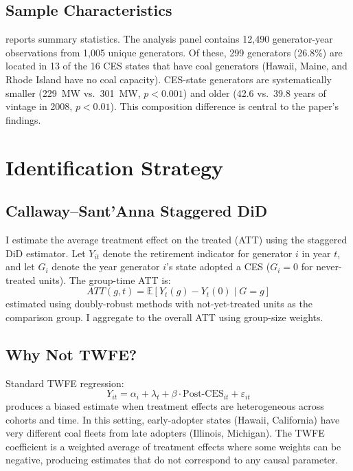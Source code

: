 \documentclass[12pt]{article}
\begin{document}
\subsection{Sample Characteristics}

 reports summary statistics. The analysis panel contains 12,490 generator-year observations from 1,005 unique generators. Of these, 299 generators (26.8\%) are located in 13 of the 16 CES states that have coal generators (Hawaii, Maine, and Rhode Island have no coal capacity). CES-state generators are systematically smaller (229~MW vs.\ 301~MW, $p < 0.001$) and older (42.6 vs.\ 39.8 years of vintage in 2008, $p < 0.01$). This composition difference is central to the paper's findings.




\section{Identification Strategy}\label{sec:identification}

\subsection{Callaway--Sant'Anna Staggered DiD}

I estimate the average treatment effect on the treated (ATT) using the \citet{CallawayS2021} staggered DiD estimator. Let $Y_{it}$ denote the retirement indicator for generator $i$ in year $t$, and let $G_i$ denote the year generator $i$'s state adopted a CES ($G_i = 0$ for never-treated units). The group-time ATT is:
\begin{equation}
ATT(g,t) = \mathbb{E}[Y_t(g) - Y_t(0) \mid G = g]
\end{equation}
estimated using doubly-robust methods with not-yet-treated units as the comparison group. I aggregate to the overall ATT using group-size weights.

\subsection{Why Not TWFE?}

Standard TWFE regression:
\begin{equation}
Y_{it} = \alpha_i + \lambda_t + \beta \cdot \text{Post-CES}_{it} + \varepsilon_{it}
\end{equation}
produces a biased estimate when treatment effects are heterogeneous across cohorts and time. In this setting, early-adopter states (Hawaii, California) have very different coal fleets from late adopters (Illinois, Michigan). The TWFE coefficient is a weighted average of treatment effects where some weights can be negative, producing estimates that do not correspond to any causal parameter.
\end{document}
